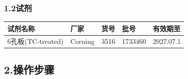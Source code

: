 \documentclass[UTF8,10pt,a4paper,fontset=fandol]{ctexart}
\newcommand{\fieldvalue}[1]{#1}
\newcommand{\handwritten}[1]{#1}
\begin{document}
\subsubsection*{1.2\quad 试剂}

\begin{tabularx}{\textwidth}{|X|X|X|X|X|}
\hline
试剂名称 & 厂家 & 货号 & 批号 & 有效期至
\\ \hline
\fieldvalue{6孔板(TC-treated)} &
\fieldvalue{Corning} &
\fieldvalue{3516} &
\fieldvalue{\handwritten{1733460}} &
\fieldvalue{\handwritten{2027.07.1}}
\\ \hline
\end{tabularx}

\subsection*{2.\quad 操作步骤}
\end{document}
